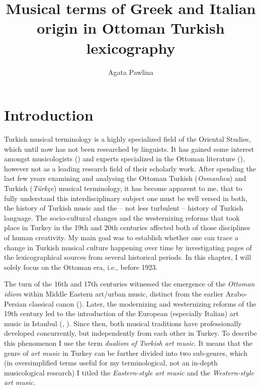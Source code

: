 \documentclass[output=paper,colorlinks,citecolor=brown,arabicfont,chinesefont]{langscibook}
\author{Agata Pawlina\affiliation{Jagiellonian University, Poland}}
\title[Musical terms of Greek and Italian origin]
      {Musical terms of Greek and Italian origin in Ottoman Turkish lexicography}
\begin{document}
 
\maketitle

\section{Introduction}\label{sec:pawlina:1}

Turkish musical terminology is a highly specialized field of the Oriental Studies, which until now has not been researched by linguists. It has gained some interest amongst musicologists (\citealt{Farmer1936, Kalender1981, Bulut2009, Tohumcu2009, Yalcin2013}) and experts specialized in the Ottoman literature (\citealt{Cetin, Kadioglu2012}), however not as a leading research field of their scholarly work. After spending the last few years examining and analysing the Ottoman Turkish (\emph{Osmanlıca}) and Turkish (\emph{Türkçe}) musical terminology, it has become apparent to me, that to fully understand this interdisciplinary subject one must be well versed in both, the history of Turkish music and the – not less turbulent – history of Turkish language. The socio-cultural changes and the westernizing reforms that took place in Turkey in the 19th and 20th centuries affected both of those disciplines of human creativity. My main goal was to establish whether one can trace a change in Turkish musical culture happening over time by investigating pages of the lexicographical sources from several historical periods. In this chapter, I will solely focus on the Ottoman era, i.e., before 1923.

The turn of the 16th and 17th centuries witnessed the emergence of the \emph{Ottoman idiom} within Middle Eastern art/urban music, distinct from the earlier Arabo-Persian classical canon (\citealt{Behar2006, Feldman1996, Greve2015, ReinhardReinhard1984, ReinhardReinhardStokes2001, Wright1992}). Later, the modernizing and westernizing reforms of the 19th century led to the introduction of the European (especially Italian) art music in Istanbul (\citealt{Araci2002,Araci2006, KomsuogluTuran2007, Ozalp2000, Turan2004,Turan2011a,Turan2011b}, \citealt{Yore2011}). Since then, both musical traditions have professionally developed concurrently, but independently from each other in Turkey. To describe this phenomenon I use the term \emph{dualism of Turkish art music}. It means that the genre of \emph{art music} in Turkey can be further divided into two sub-genres, which (in oversimplified terms useful for my terminological, not an in-depth musicological research) I titled the \emph{Eastern-style art music} and the \emph{Western-style art music}.
\end{document}
